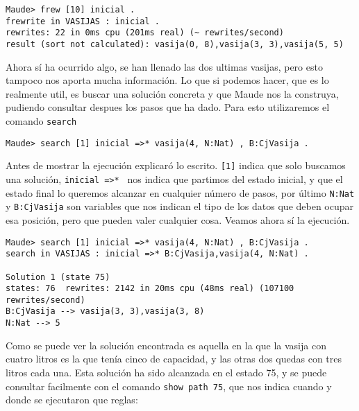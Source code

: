{\codesize
\begin{verbatim}
Maude> frew [10] inicial .
frewrite in VASIJAS : inicial .
rewrites: 22 in 0ms cpu (201ms real) (~ rewrites/second)
result (sort not calculated): vasija(0, 8),vasija(3, 3),vasija(5, 5)
\end{verbatim}
}

Ahora sí ha ocurrido algo, se han llenado las dos ultimas vasijas, pero esto tampoco nos aporta mucha información. Lo que si podemos hacer, que es lo realmente util, es buscar una solución concreta y que Maude nos la construya, pudiendo consultar despues los pasos que ha dado. Para esto utilizaremos el comando \texttt{search}

{\codesize
\begin{verbatim}
Maude> search [1] inicial =>* vasija(4, N:Nat) , B:CjVasija .
\end{verbatim}
}

Antes de mostrar la ejecución explicaró lo escrito. \verb"[1]" indica que solo buscamos una solución, \verb"inicial =>* " nos indica que partimos del estado inicial, y que el estado final lo queremos alcanzar en cualquier número de pasos, por último \verb"N:Nat" y \verb"B:CjVasija" son variables que nos indican el tipo de los datos que deben ocupar esa posición, pero que pueden valer cualquier cosa. Veamos ahora sí la ejecución.\par

{\codesize
\begin{verbatim}
Maude> search [1] inicial =>* vasija(4, N:Nat) , B:CjVasija .
search in VASIJAS : inicial =>* B:CjVasija,vasija(4, N:Nat) .

Solution 1 (state 75)
states: 76  rewrites: 2142 in 20ms cpu (48ms real) (107100 rewrites/second)
B:CjVasija --> vasija(3, 3),vasija(3, 8)
N:Nat --> 5
\end{verbatim}
}

Como se puede ver la solución encontrada es aquella en la que la vasija con cuatro litros es la que tenía cinco de capacidad, y las otras dos quedas con tres litros cada una. Esta solución ha sido alcanzada en el estado 75, y se puede consultar facilmente con el comando \verb"show path 75", que nos indica cuando y donde se ejecutaron que reglas: \par

